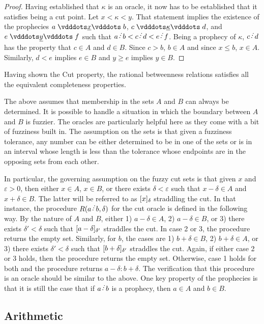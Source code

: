 \documentclass[12pt]{article}
\begin{document}
\begin{proof}
Having established that $\kappa$ is an oracle, it now has to be established that it satisfies being a cut point. Let $x < \kappa < y$. That statement implies the existence of the prophecies $a \xrel b$, $c \xrel[\kappa] d$, and $ e \xrel[y] f$ such that $a \lte b < c \lte d < e \lte f$. Being a prophecy of $\kappa$, $c \lte d$ has the property that $c \in A$ and $d \in B$. Since $c > b$, $b \in A$ and since $x \leq b$, $x \in A$. Similarly, $d < e$ implies $e \in B$ and $y \geq e$ implies $y \in B$.

\end{proof}

Having shown the Cut property, the rational betweenness relations satisfies all the equivalent completeness properties. 

The above assumes that membership in the sets $A$ and $B$ can always be determined. It is possible to handle a situation in which the boundary between $A$ and $B$ is fuzzier. The oracles are particularly helpful here as they come with a bit of fuzziness built in. The assumption on the sets is that given a fuzziness tolerance, any number can be either determined to be in one of the sets or is in an interval whose length is less than the tolerance whose endpoints are in the opposing sets from each other. 

In particular, the governing assumption on the fuzzy cut sets is that given $x$ and $\varepsilon >0$, then either $x \in A$, $x \in B$, or there exists $\delta< \varepsilon$ such that $x-\delta \in A$ and $x + \delta \in B$. The latter will be referred to as $\halo{x}$ straddling the cut. In that instance, the procedure $R(a \lte b, \delta)$ for the cut oracle is defined in the following way. By the nature of $A$ and $B$, either 1) $a - \delta \in A$, 2) $a - \delta \in B$, or 3) there exists $\delta' < \delta$ such that $\halo[\delta']{a-\delta}$ straddles the cut. In case 2 or 3, the procedure returns the empty set. Similarly, for $b$, the cases are 1) $b + \delta \in B$, 2) $b+\delta \in A$, or 3) there exists $\delta' < \delta$ such that $\halo[\delta']{b+\delta}$ straddles the cut. Again, if either case 2 or 3 holds, then the procedure returns the empty set. Otherwise, case 1 holds for both and the procedure returns $a-\delta:b+\delta$. The verification that this procedure is an oracle should be similar to the above. One key property of the prophecies is that it is still the case that if $a \lte b$ is a prophecy, then $a \in A$ and $b \in B$.


\subsection{Arithmetic}
\end{document}
